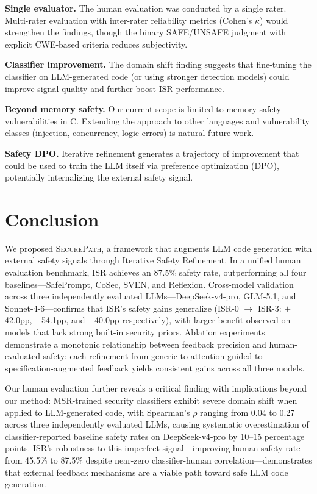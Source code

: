 \documentclass[10pt,conference]{IEEEtran}
\begin{document}
\textbf{Single evaluator.} The human evaluation was conducted by a single rater. Multi-rater evaluation with inter-rater reliability metrics (Cohen's $\kappa$) would strengthen the findings, though the binary SAFE/UNSAFE judgment with explicit CWE-based criteria reduces subjectivity.

\textbf{Classifier improvement.} The domain shift finding suggests that fine-tuning the classifier on LLM-generated code (or using stronger detection models) could improve signal quality and further boost ISR performance.

\textbf{Beyond memory safety.} Our current scope is limited to memory-safety vulnerabilities in C. Extending the approach to other languages and vulnerability classes (injection, concurrency, logic errors) is natural future work.

\textbf{Safety DPO.} Iterative refinement generates a trajectory of improvement that could be used to train the LLM itself via preference optimization (DPO), potentially internalizing the external safety signal.

\section{Conclusion}

We proposed \textsc{SecurePath}, a framework that augments LLM code generation with external safety signals through Iterative Safety Refinement. In a unified human evaluation benchmark, ISR achieves an 87.5\% safety rate, outperforming all four baselines---SafePrompt, CoSec, SVEN, and Reflexion. Cross-model validation across three independently evaluated LLMs---DeepSeek-v4-pro, GLM-5.1, and Sonnet-4-6---confirms that ISR's safety gains generalize (ISR-0 $\rightarrow$ ISR-3: $+$42.0pp, $+$54.1pp, and $+$40.0pp respectively), with larger benefit observed on models that lack strong built-in security priors. Ablation experiments demonstrate a monotonic relationship between feedback precision and human-evaluated safety: each refinement from generic to attention-guided to specification-augmented feedback yields consistent gains across all three models.

Our human evaluation further reveals a critical finding with implications beyond our method: MSR-trained security classifiers exhibit severe domain shift when applied to LLM-generated code, with Spearman's $\rho$ ranging from 0.04 to 0.27 across three independently evaluated LLMs, causing systematic overestimation of classifier-reported baseline safety rates on DeepSeek-v4-pro by 10--15 percentage points. ISR's robustness to this imperfect signal---improving human safety rate from 45.5\% to 87.5\% despite near-zero classifier-human correlation---demonstrates that external feedback mechanisms are a viable path toward safe LLM code generation.




\end{document}
